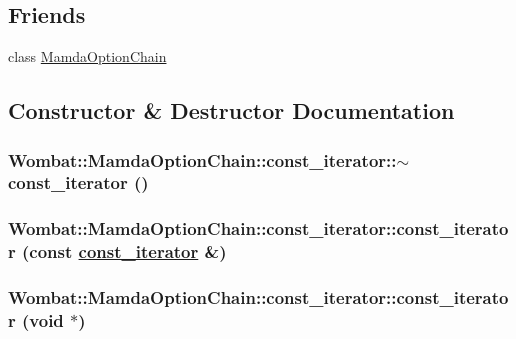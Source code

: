 \subsection*{Friends}
\begin{CompactItemize}
\item 
class \hyperlink{classWombat_1_1MamdaOptionChain_1_1const__iterator_f3175431d241ba2aa4df7e41301ee186}{Mamda\-Option\-Chain}
\end{CompactItemize}


\subsection{Constructor \& Destructor Documentation}
\hypertarget{classWombat_1_1MamdaOptionChain_1_1const__iterator_3103e1e7883cd6b836ba0633f6772a3d}{
\subsubsection[$\sim$const\_\-iterator]{\setlength{\rightskip}{0pt plus 5cm}Wombat::Mamda\-Option\-Chain::const\_\-iterator::$\sim$const\_\-iterator ()}}
\label{classWombat_1_1MamdaOptionChain_1_1const__iterator_3103e1e7883cd6b836ba0633f6772a3d}


\hypertarget{classWombat_1_1MamdaOptionChain_1_1const__iterator_b86c8020728415ca63ceaff3aa66fd6c}{
\subsubsection[const\_\-iterator]{\setlength{\rightskip}{0pt plus 5cm}Wombat::Mamda\-Option\-Chain::const\_\-iterator::const\_\-iterator (const \hyperlink{classWombat_1_1MamdaOptionChain_1_1const__iterator}{const\_\-iterator} \&)}}
\label{classWombat_1_1MamdaOptionChain_1_1const__iterator_b86c8020728415ca63ceaff3aa66fd6c}


\hypertarget{classWombat_1_1MamdaOptionChain_1_1const__iterator_c3433f2d11744b9ff17186e2aa7d0bb2}{
\subsubsection[const\_\-iterator]{\setlength{\rightskip}{0pt plus 5cm}Wombat::Mamda\-Option\-Chain::const\_\-iterator::const\_\-iterator (void $\ast$)}}
\label{classWombat_1_1MamdaOptionChain_1_1const__iterator_c3433f2d11744b9ff17186e2aa7d0bb2}




